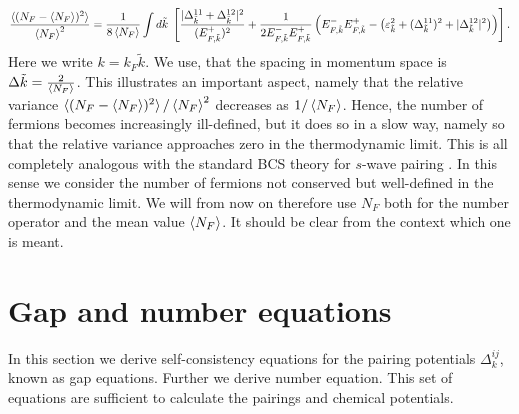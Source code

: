 \begin{equation}
\frac{\braket{(N_F - \braket{N_F})^2}}{\braket{N_F}^2} = \frac{1}{8\braket{N_F}}\int d\tilde{k} \; \left[ \frac{|\Delta^{11}_{\tilde{k}} + \Delta^{12}_{\tilde{k}}|^2}{(E^{+}_{F,\tilde{k}})^2} + \frac{1}{2E^{-}_{F,\tilde{k}}E^{+}_{F,\tilde{k}}}\left(E^{-}_{F,\tilde{k}}E^{+}_{F,\tilde{k}} - \left(\varepsilon_{\tilde{k}}^2 + (\Delta^{11}_{\tilde{k}})^2 + |\Delta^{12}_{\tilde{k}}|^2\right) \right) \right]. \nonumber
\end{equation}
Here we write $k = k_F \tilde{k}$. We use, that the spacing in momentum space is $\Delta \tilde{k} = \frac{2}{\braket{N_F}}$. This illustrates an important aspect, namely that the relative variance $\braket{(N_F - \braket{N_F})^2}/\braket{N_F}^2$ decreases as $1/\braket{N_F}$. Hence, the number of fermions becomes increasingly ill-defined, but it does so in a slow way, namely so that the relative variance approaches zero in the thermodynamic limit. This is all completely analogous with the standard BCS theory for $s$-wave pairing \cite[pp. 50-52]{Tinkham}. In this sense we consider the number of fermions not conserved but well-defined in the thermodynamic limit. We will from now on therefore use $N_F$ both for the number operator and the mean value $\braket{N_F}$. It should be clear from the context which one is meant.

\section{Gap and number equations} \label{sec.gapandnumberequations}
In this section we derive self-consistency equations for the pairing potentials $\Delta^{ij}_k$, known as gap equations. Further we derive number equation. This set of equations are sufficient to calculate the pairings and chemical potentials. 

